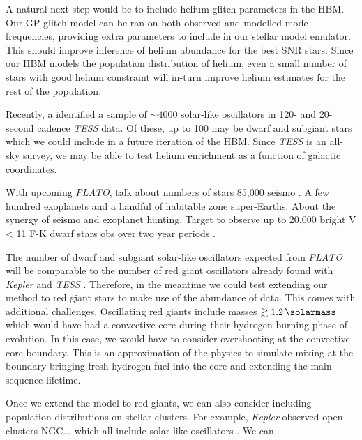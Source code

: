 A natural next step would be to include helium glitch parameters in the HBM. Our GP glitch model can be ran on both observed and modelled mode frequencies, providing extra parameters to include in our stellar model emulator. This should improve inference of helium abundance for the best SNR stars. Since our HBM models the population distribution of helium, even a small number of stars with good helium constraint will in-turn improve helium estimates for the rest of the population.

Recently, a \citet{Hatt.Nielsen.ea2023} identified a sample of \(\sim 4000\) solar-like oscillators in 120- and 20-second cadence \emph{TESS} data. Of these, up to 100 may be dwarf and subgiant stars which we could include in a future iteration of the HBM. Since \emph{TESS} is an all-sky survey, we may be able to test helium enrichment as a function of galactic coordinates.

With upcoming \emph{PLATO}, talk about numbers of stars 85,000 seismo \citep{Rauer.Catala.ea2014}. A few hundred exoplanets and a handful of habitable zone super-Earths. About the synergy of seismo and exoplanet hunting. Target to observe up to 20,000 bright V < 11 F-K dwarf stars obs over two year periods \citep{Goupil2017}. 

The number of dwarf and subgiant solar-like oscillators expected from \emph{PLATO} will be comparable to the number of red giant oscillators already found with \emph{Kepler} and \emph{TESS} \needcite. Therefore, in the meantime we could test extending our method to red giant stars to make use of the abundance of data. This comes with additional challenges. Oscillating red giants include masses \(\gtrsim \SI{1.2}{\solarmass}\) which would have had a convective core during their hydrogen-burning phase of evolution. In this case, we would have to consider overshooting at the convective core boundary. This is an approximation of the physics to simulate mixing at the boundary bringing fresh hydrogen fuel into the core and extending the main sequence lifetime.


Once we extend the model to red giants, we can also consider including population distributions on stellar clusters. For example, \emph{Kepler} observed open clusters NGC... which all include solar-like oscillators \needcite. We can 


